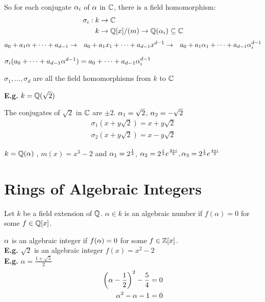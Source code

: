 \documentclass[11pt]{article}
\begin{document}
So for each conjugate $\alpha_i$ of $\alpha $ in $\mathbb{C}$, there is a field homomorphism:
\begin{align*}
	\sigma_i : k &\to \mathbb{C}\\
	 k &\to \mathbb{Q}[x]/(m) \to \mathbb{Q}(\alpha_i) \subseteq \mathbb{C}\\
\end{align*}
\vspace{-3em}
\begin{align*}
	a_0 +a_1\alpha + \dots + a_{d-1} &\to& a_0+a_1x_1+\dots+a_{d-1}x^{d-1} &\to& a_0+a_1\alpha_1 + \dots + a_{d-1}\alpha_i^{d-1} 
\end{align*}


$ \sigma_i (a_0 + \dots + a_{d-1} \alpha^{d-1}) = a_0 +\dots + a_{d-1}\alpha_i^{d-1}$
\begin{prop}
$\sigma_1, \dots, \sigma_d$ are all the field homomorphisms from $k $ to $\mathbb{C}$
\end{prop}
$ $\\[-0.5em]
\textbf{E.g.} $k = \mathbb{Q}(\sqrt{2})$

The conjugates of $\sqrt{2}$ in $\mathbb{C}$ are $\pm 2$. 
$\alpha_1 = \sqrt{2}$,
$\alpha_2 = -\sqrt{2}$
\begin{align*}
	\sigma_1(x+y\sqrt{2}) = x +y\sqrt{2} \\
	\sigma_2(x+y\sqrt{2}) = x - y\sqrt{2}
\end{align*}

$k = \mathbb{Q}(\alpha)$ , $m(x) = x^3 - 2$ and $\alpha_1 = 2^{\frac{1}{3}}$, $\alpha_2 = 2^{\frac{1}{3}}e^{\frac{2\pi i}{3}} ,\alpha_3 = 2^{\frac{1}{3}} e^{\frac{4\pi i }{3}}$

\newpage
\section{Rings of Algebraic Integers}

\begin{defn}
	Let $k$ be a field extension of $\mathbb{Q}$.
	$\alpha \in k$ is an algebraic number if $f(\alpha)=0 $ for some $f \in \mathbb{Q}[x]$.
\end{defn}
$ $\\[-.5em]
$\alpha$ is an algebraic integer if $f(\alpha) = 0 $ for some $f \in \mathbb{Z}[x]$.
$ $\\[1em]
\textbf{E.g.} $\sqrt{2}$ is an algebraic integer $f(x) =x^2 -2$\\
\textbf{E.g.} $\alpha = \frac{1+\sqrt{5}}{2}$
\begin{align*}
	\bigg(\alpha - \frac{1}{2}\bigg)^2  - \frac{5}{4} &= 0\\
	\alpha^2 - \alpha -1 & =0\\
\end{align*}
\end{document}
